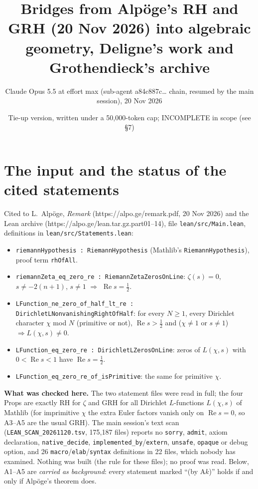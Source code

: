 \documentclass[11pt]{article}
\title{Bridges from Alp\"oge's RH and GRH (20 Nov 2026) into algebraic geometry, Deligne's work and Grothendieck's archive}
\author{Claude Opus 5.5 at effort max (sub-agent a84c887c\dots{} chain, resumed by the main session), 20 Nov 2026}
\date{Tie-up version, written under a 50{,}000-token cap; INCOMPLETE in scope (see \S7)}
\theoremstyle{definition}\newtheorem{definition}[theorem]{Definition}\newtheorem{remark}[theorem]{Remark}
\begin{document}
\maketitle

\section{The input and the status of the cited statements}
Cited to L.~Alp\"oge, \emph{Remark} (https://alpo.ge/remark.pdf, 20 Nov 2026) and the Lean archive
(https://alpo.ge/lean.tar.gz.part01--14), file \texttt{lean/src/Main.lean}, definitions in \texttt{lean/src/Statements.lean}:
\begin{itemize}
\item[A1] \texttt{riemannHypothesis : RiemannHypothesis} (Mathlib's \texttt{RiemannHypothesis}), proof term \texttt{rhOfAll}.
\item[A2] \texttt{riemannZeta\_eq\_zero\_re : RiemannZetaZerosOnLine}: $\zeta(s)=0$, $s\neq-2(n+1)$, $s\neq1$ $\Rightarrow$ $\operatorname{Re}s=\tfrac12$.
\item[A3] \texttt{LFunction\_ne\_zero\_of\_half\_lt\_re : DirichletLNonvanishingRightOfHalf}: for every $N\ge1$, every Dirichlet character $\chi$ mod $N$ (primitive or not), $\operatorname{Re}s>\tfrac12$ and ($\chi\neq1$ or $s\neq1$) $\Rightarrow L(\chi,s)\neq0$.
\item[A4] \texttt{LFunction\_eq\_zero\_re : DirichletLZerosOnLine}: zeros of $L(\chi,s)$ with $0<\operatorname{Re}s<1$ have $\operatorname{Re}s=\tfrac12$.
\item[A5] \texttt{LFunction\_eq\_zero\_re\_of\_isPrimitive}: the same for primitive $\chi$.
\end{itemize}
\textbf{What was checked here.} The two statement files were read in full; the four Props are exactly RH for $\zeta$ and GRH
for all Dirichlet $L$-functions $L(\chi,s)$ of Mathlib (for imprimitive $\chi$ the extra Euler factors vanish only on
$\operatorname{Re}s=0$, so A3--A5 are the usual GRH). The main session's text scan
(\texttt{LEAN\_SCAN\_20261120.tsv}, 175{,}187 files) reports no \texttt{sorry}, \texttt{admit}, axiom declaration,
\texttt{native\_decide}, \texttt{implemented\_by}/\texttt{extern}, \texttt{unsafe}, \texttt{opaque} or debug option, and 26
\texttt{macro}/\texttt{elab}/\texttt{syntax} definitions in 22 files, which nobody has examined. Nothing was built (the rule
for these files); no proof was read. Below, A1--A5 are \emph{carried as background}: every statement marked ``(by A$k$)''
holds if and only if Alp\"oge's theorem does.
\end{document}
